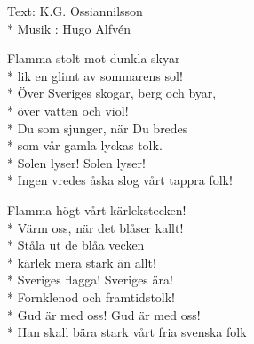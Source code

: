 \begin{SongText}
\begin{SongInfo}
Text: K.G. Ossiannilsson\\*%
Musik : Hugo Alfvén
\end{SongInfo}
\begin{Verse}
Flamma stolt mot dunkla skyar\\*%
lik en glimt av sommarens sol!\\*%
Över Sveriges skogar, berg och byar,\\*%
över vatten och viol!\\*%
Du som sjunger, när Du bredes\\*%
som vår gamla lyckas tolk.\\*%
Solen lyser! Solen lyser!\\*%
Ingen vredes åska slog vårt tappra folk!
\end{Verse}
\begin{Verse}
Flamma högt vårt kärlekstecken!\\*%
Värm oss, när det blåser kallt!\\*%
Ståla ut de blåa vecken\\*%
kärlek mera stark än allt!\\*%
Sveriges flagga! Sveriges ära!\\*%
Fornklenod och framtidstolk!\\*%
Gud är med oss! Gud är med oss!\\*%
Han skall bära stark vårt fria svenska folk
\end{Verse}
\end{SongText}






\newpage